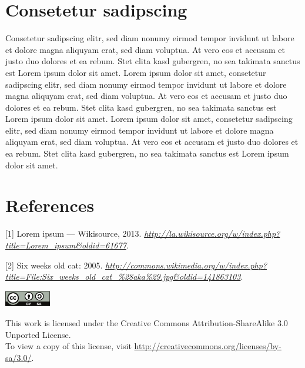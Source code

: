 \documentclass[12pt,twocolumn]{article}
\begin{document}
\section{Consetetur sadipscing}\label{consetetur-sadipscing}

Consetetur sadipscing elitr, sed diam nonumy eirmod tempor invidunt ut
labore et dolore magna aliquyam erat, sed diam voluptua. At vero eos et
accusam et justo duo dolores et ea rebum. Stet clita kasd gubergren, no
sea takimata sanctus est Lorem ipsum dolor sit amet. Lorem ipsum dolor
sit amet, consetetur sadipscing elitr, sed diam nonumy eirmod tempor
invidunt ut labore et dolore magna aliquyam erat, sed diam voluptua. At
vero eos et accusam et justo duo dolores et ea rebum. Stet clita kasd
gubergren, no sea takimata sanctus est Lorem ipsum dolor sit amet. Lorem
ipsum dolor sit amet, consetetur sadipscing elitr, sed diam nonumy
eirmod tempor invidunt ut labore et dolore magna aliquyam erat, sed diam
voluptua. At vero eos et accusam et justo duo dolores et ea rebum. Stet
clita kasd gubergren, no sea takimata sanctus est Lorem ipsum dolor sit
amet.

\section*{References}\label{references}

{[}1{]} Lorem ipsum --- Wikisource, 2013.
\emph{\url{http://la.wikisource.org/w/index.php?title=Lorem_ipsum\&oldid=61677}}.

{[}2{]} Six weeks old cat: 2005.
\emph{\url{http://commons.wikimedia.org/w/index.php?title=File:Six_weeks_old_cat_\%28aka\%29.jpg\&oldid=141863103}}.

\begin{center}
  \includegraphics[width=2cm]{images/by-sa.pdf}
  
  \scriptsize This work is licensed under the Creative Commons
  Attribution-ShareAlike 3.0 Unported License.\\ To view a copy
  of this license, visit
  \url{http://creativecommons.org/licenses/by-sa/3.0/}.
\end{center}
\end{document}
